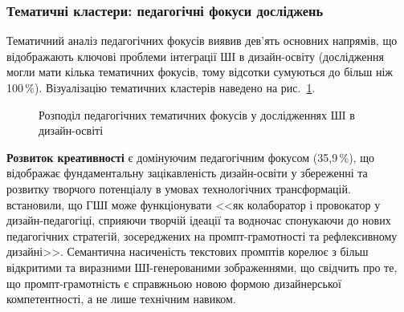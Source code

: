 \subsubsection{Тематичні кластери: педагогічні фокуси досліджень}\label{sssec:1.2.6}

Тематичний аналіз педагогічних фокусів виявив дев'ять основних напрямів, що відображають ключові проблеми інтеграції ШІ в дизайн-освіту (дослідження могли мати кілька тематичних фокусів, тому відсотки сумуються до більш ніж 100\,\%). Візуалізацію тематичних кластерів наведено на рис.~\ref{fig:1.2_themes}.

\begin{figure}[htbp]
\centering
{}
\caption{Розподіл педагогічних тематичних фокусів у дослідженнях ШІ в дизайн-освіті}
\label{fig:1.2_themes}
\end{figure}

\textbf{Розвиток креативності} є домінуючим педагогічним фокусом (35,9\,\%), що відображає фундаментальну зацікавленість дизайн-освіти у збереженні та розвитку творчого потенціалу в умовах технологічних трансформацій. \citet{MedelVera2025} встановили, що ГШІ може функціонувати <<як колаборатор і провокатор у дизайн-педагогіці, сприяючи творчій ідеації та водночас спонукаючи до нових педагогічних стратегій, зосереджених на промпт-грамотності та рефлексивному дизайні>>. Семантична насиченість текстових промптів корелює з більш відкритими та виразними ШІ-генерованими зображеннями, що свідчить про те, що промпт-грамотність є справжньою новою формою дизайнерської компетентності, а не лише технічним навиком.


